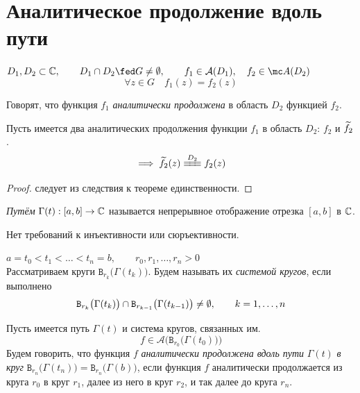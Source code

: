 \section{Аналитическое продолжение вдоль пути}

\begin{definition}
	$ D_1, D_2 \sub \Co, \qquad D_1 \cap D_2 \fed G \ne \O, \qquad f_1 \in \mathcal A(D_1), \quad f_2 \in \mc A(D_2) $
	$$ \forall z \in G \quad f_1(z) = f_2(z) $$

	Говорят, что функция $ f_1 $ \emph{аналитически продолжена} в область $ D_2 $ функцией $ f_2 $.
\end{definition}

\begin{theorem}
	Пусть имеется два аналитических продолжения функции $ f_1 $ в область $ D_2 $: $ f_2 $ и $ \widetilde{f_2} $.
	$$ \implies \vawe{f_2}(z) \equiv[D_2] f_2(z) $$
\end{theorem}

\begin{proof}
	следует из следствия к теореме единственности.
\end{proof}

\begin{definition}
	\emph{Путём} $ \Gamma(t) : [a, b] \to \mathbb{C} $ называется непрерывное отображение отрезка $ [a, b] $ в $ \mathbb{C} $.
\end{definition}

\begin{remark}
	Нет требований к инъективности или сюръективности.
\end{remark}

\begin{definition}
	$ a = t_0 < t_1 < \dots < t_n = b, \qquad r_0, r_1, \dots, r_n > 0 $ \\
	Рассматриваем круги $ \mathtt B_{r_k} \big( \Gamma(t_k) \big) $.
	Будем называть их \emph{системой кругов}, если выполнено
	$$ \mathtt B_{r_k} \big( \Gamma(t_k) \big) \cap \mathtt B_{r_{k - 1}} \big( \Gamma(t_{k - 1}) \big) \ne \emptyset, \qquad k = 1, \dots, n $$
\end{definition}

\begin{definition}
	Пусть имеется путь $ \Gamma(t) $ и система кругов, связанных им.
	$$ f \in \mathcal A \bigg( \mathtt B_{r_0} \big( \Gamma(t_0) \big) \bigg) $$
	Будем говорить, что функция $ f $ \emph{аналитически продолжена вдоль пути} $ \Gamma(t) $ \emph{в круг} $ \mathtt B_{r_n} \big( \Gamma(t_n) \big) = \mathtt B_{r_n} \big( \Gamma(b) \big) $, если функция $ f $ аналитически продолжается из круга $ r_0 $ в круг $ r_1 $, далее из него в круг $ r_2 $, и так далее до круга $ r_n $.
\end{definition}

